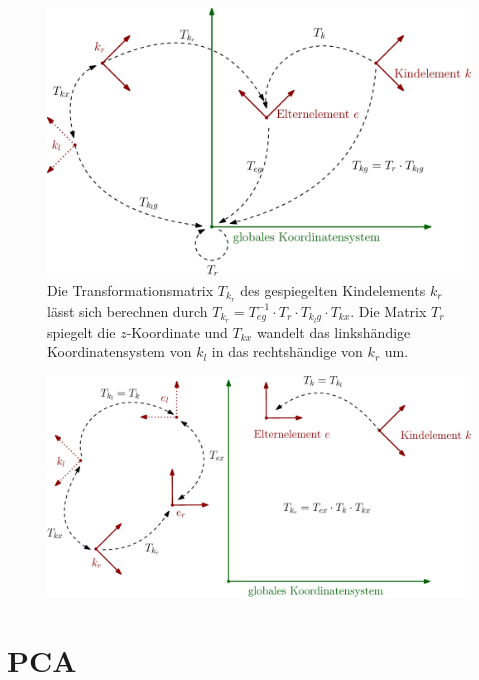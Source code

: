 \begin{figure}
 \centering
 \includegraphics[width=\textwidth]{graphics/transformation_matrices_non_mirrored_parent}
 \caption{Die Transformationsmatrix $T_{k_r}$ des gespiegelten Kindelements $k_r$ lässt sich berechnen durch $T_{k_r} = T_{eg}^{-1} \cdot T_r \cdot T_{k_lg} \cdot T_{kx}$. Die Matrix $T_r$ spiegelt die $z$-Koordinate und $T_{kx}$ wandelt das linkshändige Koordinatensystem von $k_l$ in das rechtshändige von $k_r$ um.}
 \label{transformation_matrix_non_mirrored_parent}
\end{figure}

\begin{figure}
 \centering
 \includegraphics[width=\textwidth]{graphics/transformation_matrices_mirrored_parent}
 \caption{}
 \label{transformation_matrix_mirrored_parent}
\end{figure}

\section{PCA}
\label{implementation_detail_pca}

